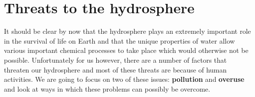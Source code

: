     \section{Threats to the hydrosphere}
            \nopagebreak
      \label{m38138*id342204}It should be clear by now that the hydrosphere plays an extremely important role in the survival of life on Earth and that the unique properties of water allow various important chemical processes to take place which would otherwise not be possible. Unfortunately for us however, there are a number of factors that threaten our hydrosphere and most of these threats are because of human activities. We are going to focus on two of these issues: \textbf{pollution} and \textbf{overuse} and look at ways in which these problems can possibly be overcome.\par 
{}
